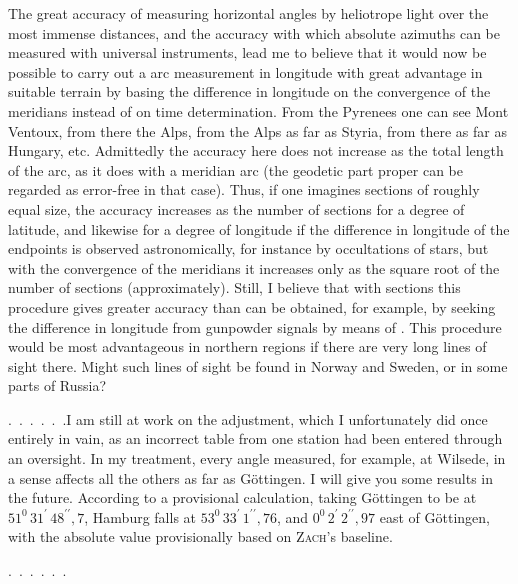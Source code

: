 \par\noindent\hspace*{\parindent}The great accuracy of measuring horizontal angles by heliotrope light over the most immense distances, and the accuracy with which absolute azimuths can be measured with universal instruments, lead me to believe that it would now be possible to carry out a arc measurement in longitude with great advantage in suitable terrain by basing the difference in longitude on the convergence of the meridians instead of on time determination.
From the Pyrenees one can see Mont Ventoux, from there the Alps, from the Alps as far as Styria, from there as far as Hungary, etc.
Admittedly the accuracy here does not increase as the total length of the arc, as it does with a meridian arc (the geodetic part proper can be regarded as error-free in that case). Thus, if one imagines sections of roughly equal size, the accuracy increases as the number of sections for a degree of latitude, and likewise for a degree of longitude if the difference in longitude of the endpoints is observed astronomically, for instance by occultations of stars, but with the convergence of the meridians it increases only as the square root of the number of sections (approximately). Still, I believe that with  sections this procedure gives greater accuracy than can be obtained, for example, by seeking the difference in longitude from gunpowder signals by means of .
This procedure would be most advantageous in northern regions if there are very long lines of sight there.
Might such lines of sight be found in Norway and Sweden, or in some parts of Russia?

\par\noindent\hspace*{\parindent}.\ .\ .\ .\ .\ .\quad I am still at work on the adjustment, which I unfortunately did once entirely in vain, as an incorrect table from one station had been entered through an oversight.
In my treatment, every angle measured, for example, at Wilsede, in a sense affects all the others as far as Göttingen.
I will give you some results in the future.
According to a provisional calculation, taking Göttingen to be at \(51^{0}\,31^{\prime}\,48^{\prime\prime}{,}7\), Hamburg falls at \(53^{0}\,33^{\prime}\,1^{\prime\prime}{,}76\), and \(0^{0}\,2^{\prime}\,2^{\prime\prime}{,}97\) east of Göttingen, with the absolute value provisionally based on \textsc{Zach}'s baseline.
\par\noindent\hspace*{\parindent}.\ .\ .\ .\ .\ .
\endgroup
